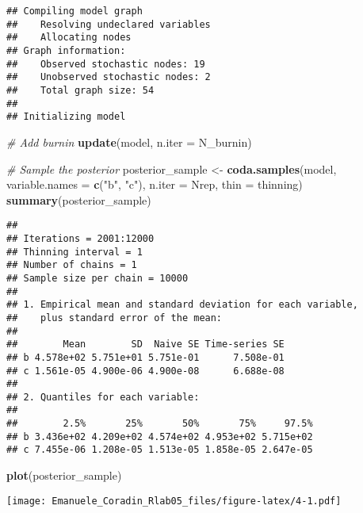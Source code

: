 \documentclass[
]{article}
\newenvironment{Shaded}{\begin{snugshade}}{\end{snugshade}}
\newcommand{\AttributeTok}[1]{\textcolor[rgb]{0.13,0.29,0.53}{#1}}
\newcommand{\CommentTok}[1]{\textcolor[rgb]{0.56,0.35,0.01}{\textit{#1}}}
\newcommand{\FunctionTok}[1]{\textcolor[rgb]{0.13,0.29,0.53}{\textbf{#1}}}
\newcommand{\NormalTok}[1]{#1}
\newcommand{\OtherTok}[1]{\textcolor[rgb]{0.56,0.35,0.01}{#1}}
\newcommand{\StringTok}[1]{\textcolor[rgb]{0.31,0.60,0.02}{#1}}
\begin{document}
\begin{verbatim}
## Compiling model graph
##    Resolving undeclared variables
##    Allocating nodes
## Graph information:
##    Observed stochastic nodes: 19
##    Unobserved stochastic nodes: 2
##    Total graph size: 54
## 
## Initializing model
\end{verbatim}

\begin{Shaded}
\begin{Highlighting}[]
\CommentTok{\# Add burnin}
\FunctionTok{update}\NormalTok{(model, }\AttributeTok{n.iter =}\NormalTok{ N\_burnin)}

\CommentTok{\# Sample the posterior}
\NormalTok{posterior\_sample }\OtherTok{\textless{}{-}} \FunctionTok{coda.samples}\NormalTok{(model,}
                       \AttributeTok{variable.names =} \FunctionTok{c}\NormalTok{(}\StringTok{"b"}\NormalTok{, }\StringTok{"c"}\NormalTok{),}
                       \AttributeTok{n.iter =}\NormalTok{ Nrep, }\AttributeTok{thin =}\NormalTok{ thinning)}
\FunctionTok{summary}\NormalTok{(posterior\_sample)}
\end{Highlighting}
\end{Shaded}

\begin{verbatim}
## 
## Iterations = 2001:12000
## Thinning interval = 1 
## Number of chains = 1 
## Sample size per chain = 10000 
## 
## 1. Empirical mean and standard deviation for each variable,
##    plus standard error of the mean:
## 
##        Mean        SD  Naive SE Time-series SE
## b 4.578e+02 5.751e+01 5.751e-01      7.508e-01
## c 1.561e-05 4.900e-06 4.900e-08      6.688e-08
## 
## 2. Quantiles for each variable:
## 
##        2.5%       25%       50%       75%     97.5%
## b 3.436e+02 4.209e+02 4.574e+02 4.953e+02 5.715e+02
## c 7.455e-06 1.208e-05 1.513e-05 1.858e-05 2.647e-05
\end{verbatim}

\begin{Shaded}
\begin{Highlighting}[]
\FunctionTok{plot}\NormalTok{(posterior\_sample)}
\end{Highlighting}
\end{Shaded}

\texttt{[image: Emanuele\_Coradin\_Rlab05\_files/figure-latex/4-1.pdf]}
\end{document}

